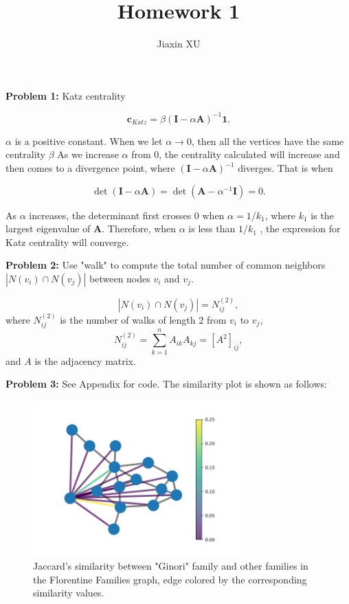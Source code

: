 \documentclass[11pt]{article}
\title{Homework 1}
\author{Jiaxin XU}
\begin{document}
\maketitle

\textbf{Problem 1:} Katz centrality

\[ \textbf{c}_{Katz} = \beta(\textbf{I}-\alpha \textbf{A})^{-1} \textbf{1}. \]

$\alpha$ is a positive constant. When we let $\alpha \to 0$, then all the vertices have the same centrality $\beta$ As we increase $\alpha$ from $0$, the centrality calculated will increase and then comes to a divergence point, where $(\textbf{I}-\alpha \textbf{A})^{-1}$ diverges. That is when

\[ \det(\textbf{I}-\alpha \textbf{A}) = \det(\textbf{A} - \alpha ^{-1}\textbf{I} ) = 0.\]

As $\alpha$ increases, the determinant first crosses $0$ when $\alpha = 1/k_{1}$, where $k_{1}$ is the largest eigenvalue of $\textbf{A}$. Therefore, when $\alpha$ is less than $1/k_{1}$ , the expression for Katz centrality will converge.
\clearpage


\textbf{Problem 2:} Use "walk" to compute the total number of common neighbors $|N(v_{i})\cap N(v_{j})|$ between nodes $v_{i}$ and $v_{j}$.

\[|N(v_{i})\cap N(v_{j})| = N_{ij}^{(2)}, \]
where $ N_{ij}^{(2)}$ is the number of walks of length 2 from $v_{i}$ to $v_{j}$,  
\[ N_{ij}^{(2)} = \sum_{k=1}^{n} A_{ik}A_{kj} = [A^{2}]_{ij} ,\]
and $A$ is the adjacency matrix.

\clearpage

\textbf{Problem 3:} See Appendix for code.
The similarity plot is shown as follows:
\begin{figure}[h]
\includegraphics[width=8cm]{"Figure_1.png"}
\centering
\caption{Jaccard's similarity between "Ginori" family and other families in the Florentine Families graph, edge colored by the corresponding similarity values.}
\end{figure}
\end{document}
